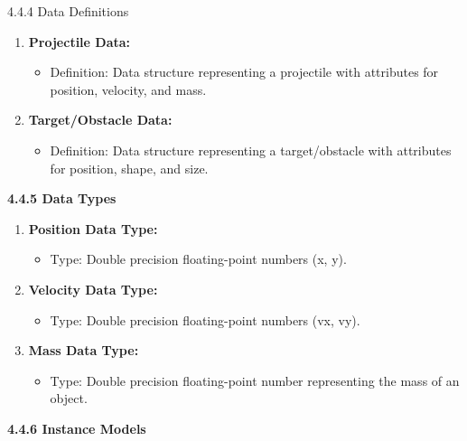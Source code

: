 \documentclass[
]{article}
\begin{document}
4.4.4 Data Definitions

\begin{enumerate}
\def\labelenumi{\arabic{enumi}.}
\item
  \textbf{Projectile Data:}

  \begin{itemize}
  \item
    Definition: Data structure representing a projectile with attributes
    for position, velocity, and mass.
  \end{itemize}
\item
  \textbf{Target/Obstacle Data:}

  \begin{itemize}
  \item
    Definition: Data structure representing a target/obstacle with
    attributes for position, shape, and size.
  \end{itemize}
\end{enumerate}

\protect\hypertarget{qkl}{}{}\textbf{4.4.5 Data Types}


\begin{enumerate}
\def\labelenumi{\arabic{enumi}.}
\item
  \textbf{Position Data Type:}

  \begin{itemize}
  \item
    Type: Double precision floating-point numbers (x, y).
  \end{itemize}
\item
  \textbf{Velocity Data Type:}

  \begin{itemize}
  \item
    Type: Double precision floating-point numbers (vx, vy).
  \end{itemize}
\item
  \textbf{Mass Data Type:}

  \begin{itemize}
  \item
    Type: Double precision floating-point number representing the mass
    of an object.
  \end{itemize}
\end{enumerate}

\protect\hypertarget{qrrrrrrrrrrrrrrrrr}{}{}\textbf{4.4.6 Instance
Models}
\end{document}
